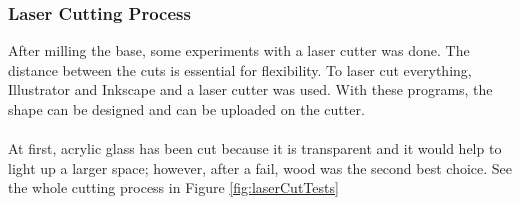 \documentclass[04.3_buildingProcess.tex]{subfiles}
\begin{document}
    \subsubsection{Laser Cutting Process}
    \begin{flushleft}
        \noindent
        After milling the base, some experiments with a laser cutter was done. The distance between the
        cuts is essential for flexibility. To laser cut everything, Illustrator\cite{illustrator} and 
        Inkscape \cite{inkscape} and a laser cutter was used. With these programs, the shape can be 
        designed and can be uploaded on the cutter. \\~\\

        \noindent
        At first, acrylic glass has been cut because it is transparent and it would help to light up 
        a larger space; however, after a fail, wood was the second best choice. See the whole cutting process 
        in Figure \ref{fig:laserCutTests}


\end{flushleft}
\end{document}
